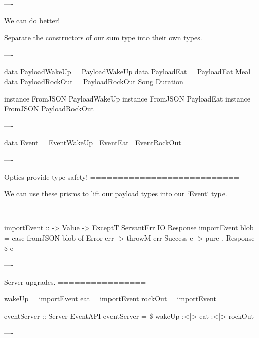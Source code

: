 ----

We can do better!
=================

Separate the constructors of our sum type into their own types.

----

\begin{hs}
  data PayloadWakeUp  = PayloadWakeUp
  data PayloadEat     = PayloadEat     Meal
  data PayloadRockOut = PayloadRockOut Song Duration

  instance FromJSON PayloadWakeUp
  instance FromJSON PayloadEat
  instance FromJSON PayloadRockOut
\end{hs}

----

\begin{raw}

  data Event = EventWakeUp  
             | EventEat     
             | EventRockOut 

\end{raw}

----

Optics provide type safety!
===========================

We can use these prisms to lift our payload types into our `Event` type.

----

\begin{raw}

  importEvent :: 
              -> Value
              -> ExceptT ServantErr IO Response
  importEvent  blob =
    case fromJSON blob of
      Error   err -> throwM err
      Success e   -> pure . Response \$  e
\end{raw}

----

Server upgrades.
================

\begin{raw}
  wakeUp  = importEvent 
  eat     = importEvent 
  rockOut = importEvent 

  eventServer :: Server EventAPI
  eventServer =  \$
    wakeUp :<|> eat :<|> rockOut
\end{raw}

----

